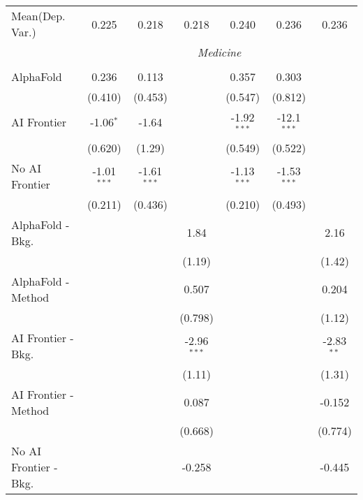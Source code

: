 \begin{tabular}{lcccccc}
Mean(Dep. Var.) & 0.225 & 0.218 & 0.218 & 0.240 & 0.236 & 0.236 \\
 & \multicolumn{6}{c}{\textit{Medicine}} \\ \\
   AlphaFold               & 0.236         & 0.113         &               & 0.357         & 0.303         &   \\   
                           & (0.410)       & (0.453)       &               & (0.547)       & (0.812)       &   \\   
   AI Frontier             & -1.06$^{*}$   & -1.64         &               & -1.92$^{***}$ & -12.1$^{***}$ &   \\   
                           & (0.620)       & (1.29)        &               & (0.549)       & (0.522)       &   \\   
   No AI Frontier          & -1.01$^{***}$ & -1.61$^{***}$ &               & -1.13$^{***}$ & -1.53$^{***}$ &   \\   
                           & (0.211)       & (0.436)       &               & (0.210)       & (0.493)       &   \\   
   AlphaFold - Bkg.        &               &               & 1.84          &               &               & 2.16\\   
                           &               &               & (1.19)        &               &               & (1.42)\\   
   AlphaFold - Method      &               &               & 0.507         &               &               & 0.204\\   
                           &               &               & (0.798)       &               &               & (1.12)\\   
   AI Frontier - Bkg.      &               &               & -2.96$^{***}$ &               &               & -2.83$^{**}$\\   
                           &               &               & (1.11)        &               &               & (1.31)\\   
   AI Frontier - Method    &               &               & 0.087         &               &               & -0.152\\   
                           &               &               & (0.668)       &               &               & (0.774)\\   
   No AI Frontier - Bkg.   &               &               & -0.258        &               &               & -0.445\\   

\end{tabular}
